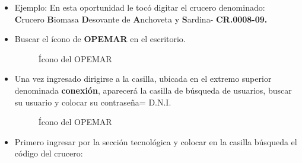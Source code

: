 \documentclass[a4paper,oneside,11pt]{book}
\begin{document}
\begin{itemize}
\item Ejemplo: En esta oportunidad le tocó digitar el crucero denominado:  \\\textbf{ C}rucero\textbf{ B}iomasa \textbf{D}esovante de \textbf{A}nchoveta y \textbf{S}ardina- \textbf{CR.0008-09.}
\item Buscar el ícono de \textbf{OPEMAR} en el escritorio.

 \begin{figure}[!h]
 \begin{center} 
 \caption{Ícono del OPEMAR}
\end{center}
 \end{figure}

\item Una vez ingresado dirigirse a la casilla, ubicada en el extremo superior denominada \textbf{conexión}, aparecerá la casilla de búsqueda de usuarios, buscar su usuario y colocar su contraseña= D.N.I.


\begin{figure}[!h]
 \begin{center} 
 \caption{Ícono del OPEMAR}
\end{center}
 \end{figure}

\item Primero ingresar por la sección tecnológica y colocar en la casilla búsqueda el código del crucero: 

\begin{center}
\end{center}


\end{itemize}
\end{document}
